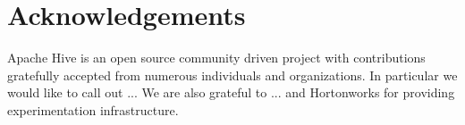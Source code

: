\documentclass{vldb}
\begin{document}



\section*{Acknowledgements}
Apache Hive is an open source community driven project with contributions gratefully accepted from numerous individuals and organizations. 
In particular we would like to call out ...
We are also grateful to ... and Hortonworks for providing experimentation infrastructure. 

\balance
\small


\end{document}
